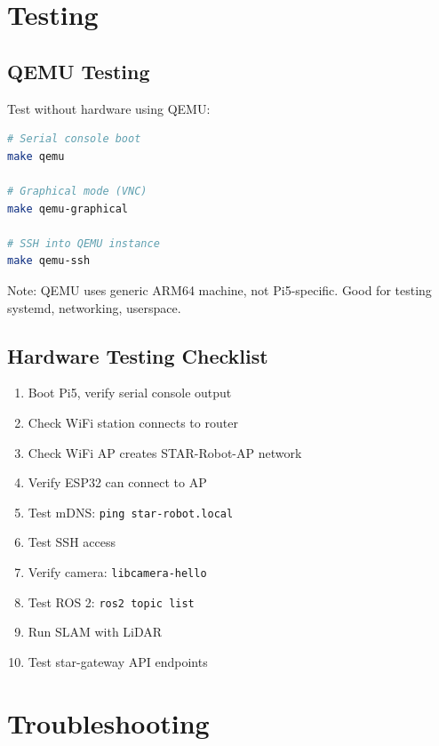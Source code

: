 \section{Testing}

\subsection{QEMU Testing}

Test without hardware using QEMU:

\begin{lstlisting}[language=bash]
# Serial console boot
make qemu

# Graphical mode (VNC)
make qemu-graphical

# SSH into QEMU instance
make qemu-ssh
\end{lstlisting}

Note: QEMU uses generic ARM64 machine, not Pi5-specific. Good for testing systemd, networking, userspace.

\subsection{Hardware Testing Checklist}

\begin{enumerate}
    \item Boot Pi5, verify serial console output
    \item Check WiFi station connects to router
    \item Check WiFi AP creates STAR-Robot-AP network
    \item Verify ESP32 can connect to AP
    \item Test mDNS: \texttt{ping star-robot.local}
    \item Test SSH access
    \item Verify camera: \texttt{libcamera-hello}
    \item Test ROS 2: \texttt{ros2 topic list}
    \item Run SLAM with LiDAR
    \item Test star-gateway API endpoints
\end{enumerate}

\section{Troubleshooting}

